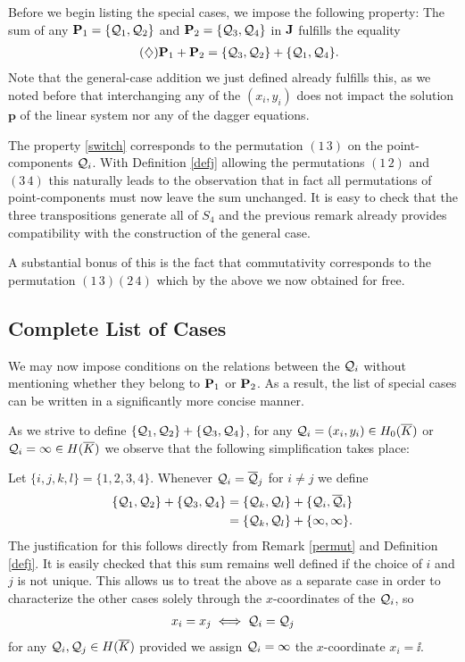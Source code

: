 \documentclass[english,11pt,a4paper]{article}
\begin{document}
Before we begin listing the special cases, we impose the following property: The sum of any $\P_1 = \{\q_1,\q_2\}$ and $\P_2 = \{\q_3,\q_4\}$ in $\J$ fulfills the equality
\begin{align*}
	\tag{$\diamondsuit$} \label{switch} \P_1 + \P_2 &= \{\q_3,\q_2\} + \{\q_1,\q_4\}.
\end{align*}
Note that the general-case addition we just defined already fulfills this, as we noted before that interchanging any of the $(x_i, y_i)$ does not impact the solution $\mathbf{p}$ of the linear system nor any of the dagger equations.

\begin{remark}\label{permut}
	The property \eqref{switch} corresponds to the permutation $(1 \, 3)$ on the point-components $\q_i$. With Definition \ref{defj} allowing the permutations $(1 \, 2)$ and $(3 \, 4)$ this naturally leads to the observation that in fact all permutations of point-components must now leave the sum unchanged. It is easy to check that the three transpositions generate all of $S_4$ and the previous remark already provides compatibility with the construction of the general case.

	A substantial bonus of this is the fact that commutativity corresponds to the permutation $(1 \, 3)(2 \, 4)$ which by the above we now obtained for free.
\end{remark}



\subsection{Complete List of Cases}

We may now impose conditions on the relations between the $\q_i$ without mentioning whether they belong to $\P_1$ or $\P_2$. As a result, the list of special cases can be written in a significantly more concise manner.

As we strive to define $\{ \q_1 , \q_2 \} + \{ \q_3 , \q_4 \}$, for any $\q_i = (x_i,y_i) \in \enkb$ or $\q_i = \infty \in \ekb$ we observe that the following simplification takes place:

Let $\{ i,j,k,l \}=\{ 1,2,3,4 \}$. Whenever $\q_i = \bar \q_j$ for $i \neq j$ we define
\begin{align*}
  \{ \q_1 , \q_2 \} + \{ \q_3 , \q_4 \} &= \{ \q_k , \q_l \} + \{ \q_i , \bar \q_i \}\\
  &= \{ \q_k , \q_l \} + \{ \infty, \infty \}.
\end{align*}
The justification for this follows directly from Remark \ref{permut} and Definition \ref{defj}. It is easily checked that this sum remains well defined if the choice of $i$ and $j$ is not unique. This allows us to treat the above as a separate case in order to characterize the other cases solely through the $x$-coordinates of the $\q_i$, so
\begin{align*}
  x_i = x_j \iff \q_i = \q_j
\end{align*}
for any $\q_i, \q_j \in \ekb$ provided we assign $\q_i = \infty$ the $x$-coordinate $x_i = \ii$.
\end{document}
